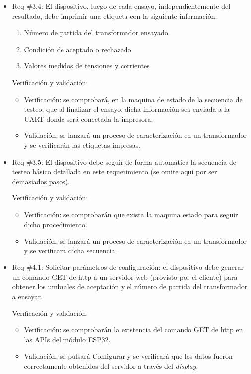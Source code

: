 \documentclass[11pt]{charter}
\begin{document}
\begin{itemize} 
\item Req \#3.4: El dispositivo, luego de cada ensayo, independientemente del resultado, debe imprimir una etiqueta con la siguiente información:
                \begin{enumerate}
                \item Número de partida del transformador ensayado
                \item Condición de aceptado o rechazado
                \item Valores medidos de tensiones y corrientes
                \end{enumerate}

Verificación y validación:

\begin{itemize}
\item Verificación: se comprobará, en la maquina de estado de la secuencia de testeo, que al finalizar el ensayo, dicha información sea enviada a la UART donde será conectada la impresora. 
\item Validación: se lanzará un proceso de caracterización en un transformador y se verificarán las etiquetas impresas.
\end{itemize}

\end{itemize}

\begin{itemize} 
\item Req \#3.5: El dispositivo debe seguir de forma automática la secuencia de testeo básico detallada en este requerimiento (se omite aquí por ser demasiados pasos).

Verificación y validación:

\begin{itemize}
\item Verificación: se comprobarán que exista la maquina estado para seguir dicho procedimiento.
\item Validación: se lanzará un proceso de caracterización en un transformador y se verificará dicha secuencia.  
\end{itemize}

\end{itemize}

\begin{itemize} 
\item Req \#4.1: Solicitar parámetros de configuración: el dispositivo debe generar un comando GET de http a un servidor web (provisto por el cliente) para obtener los umbrales de aceptación y el número de partida del transformador a ensayar.

Verificación y validación:

\begin{itemize}
\item Verificación: se comprobarán la existencia  del comando GET de http en las APIs del módulo ESP32.
\item Validación: se pulsará Configurar y se verificará que los datos fueron correctamente obtenidos del servidor a través del \textit{display}.
\end{itemize}

\end{itemize}
\end{document}
